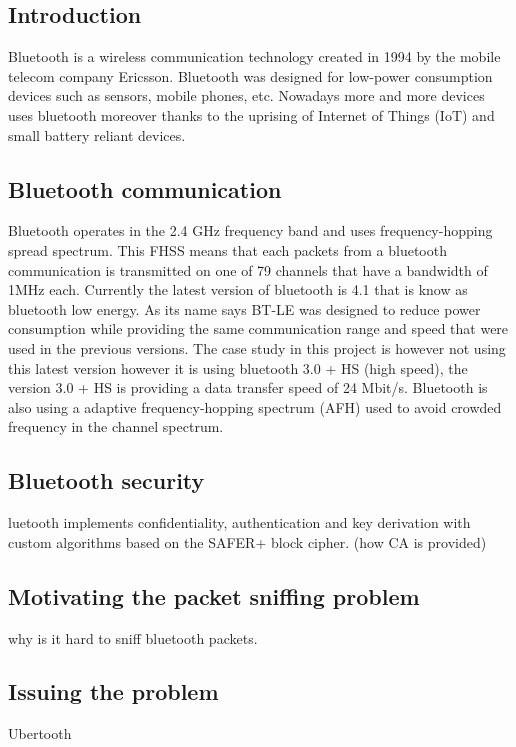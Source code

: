 \subsection{Introduction}
Bluetooth is a wireless communication technology created in 1994 by the mobile telecom company Ericsson. Bluetooth was designed for low-power consumption devices such as sensors, mobile phones, etc. Nowadays more and more devices uses bluetooth moreover thanks to the uprising of Internet of Things (IoT) and small battery reliant devices.

\subsection{Bluetooth communication}
Bluetooth operates in the 2.4 GHz frequency band and uses frequency-hopping spread spectrum. This FHSS means that each packets from a bluetooth communication is transmitted on one of 79 channels that have a bandwidth of 1MHz each. 
Currently the latest version of bluetooth is 4.1 that is know as bluetooth low energy. As its name says BT-LE was designed to reduce power consumption while providing the same communication range and speed that were used in the previous versions. The case study in this project is however not using this latest version however it is using bluetooth 3.0 + HS (high speed), the version 3.0 + HS is providing a data transfer speed of 24 Mbit/s. Bluetooth is also using a adaptive frequency-hopping spectrum (AFH) used to avoid crowded frequency in the channel spectrum.

\subsection{Bluetooth security}
luetooth implements confidentiality, authentication and key derivation with custom algorithms based on the SAFER+ block cipher. (how CA is provided)

\subsection{Motivating the packet sniffing problem}
why is it hard to sniff bluetooth packets.

\subsection{Issuing the problem}
Ubertooth
